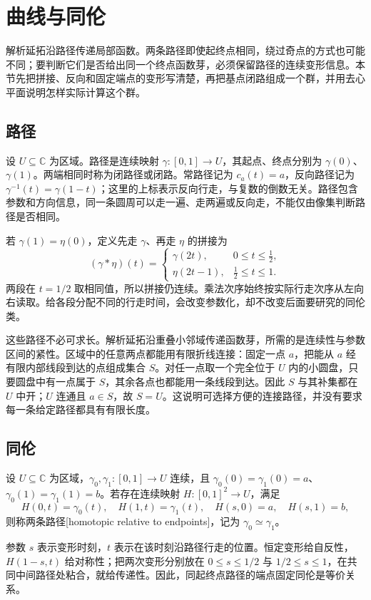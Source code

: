 \section{曲线与同伦}
\label{b3:sec:0901}

解析延拓沿路径传递局部函数。两条路径即使起终点相同，绕过奇点的方式也可能不同；要判断它们是否给出同一个终点函数芽，必须保留路径的连续变形信息。本节先把拼接、反向和固定端点的变形写清楚，再把基点闭路组成一个群，并用去心平面说明怎样实际计算这个群。

\subsection{路径}
\label{b3:subsec:090101}

设 \(U\subseteq\mathbb C\) 为区域。路径是连续映射 \(\gamma:[0,1]\to U\)，其起点、终点分别为 \(\gamma(0)\)、\(\gamma(1)\)。两端相同时称为闭路径或闭路。常路径记为 \(c_a(t)=a\)，反向路径记为 \(\gamma^{-1}(t)=\gamma(1-t)\)；这里的上标表示反向行走，与复数的倒数无关。路径包含参数和方向信息，同一条圆周可以走一遍、走两遍或反向走，不能仅由像集判断路径是否相同。

\ProseParagraphBreak
若 \(\gamma(1)=\eta(0)\)，定义先走 \(\gamma\)、再走 \(\eta\) 的拼接为
\[
 (\gamma*\eta)(t)=
 \begin{cases}
  \gamma(2t),&0\le t\le\tfrac12,\\
  \eta(2t-1),&\tfrac12\le t\le1.
 \end{cases}
\]
两段在 \(t=1/2\) 取相同值，所以拼接仍连续。乘法次序始终按实际行走次序从左向右读取。给各段分配不同的行走时间，会改变参数化，却不改变后面要研究的同伦类。

\ProseParagraphBreak
这些路径不必可求长。解析延拓沿重叠小邻域传递函数芽，所需的是连续性与参数区间的紧性。区域中的任意两点都能用有限折线连接：固定一点 \(a\)，把能从 \(a\) 经有限内部线段到达的点组成集合 \(S\)。对任一点取一个完全位于 \(U\) 内的小圆盘，只要圆盘中有一点属于 \(S\)，其余各点也都能用一条线段到达。因此 \(S\) 与其补集都在 \(U\) 中开；\(U\) 连通且 \(a\in S\)，故 \(S=U\)。这说明可选择方便的连接路径，并没有要求每一条给定路径都具有有限长度。

\subsection{同伦}
\label{b3:subsec:090102}

\begin{definition}\label{b3:def:09-endpoint-homotopy}
设 \(U\subseteq\mathbb C\) 为区域，\(\gamma_0,\gamma_1:[0,1]\to U\) 连续，且 \(\gamma_0(0)=\gamma_1(0)=a\)、\(\gamma_0(1)=\gamma_1(1)=b\)。若存在连续映射 \(H:[0,1]^2\to U\)，满足
\[
 H(0,t)=\gamma_0(t),\quad H(1,t)=\gamma_1(t),
 \quad H(s,0)=a,\quad H(s,1)=b,
\]
则称两条路径[homotopic relative to endpoints]，记为 \(\gamma_0\simeq\gamma_1\)。
\end{definition}
参数 \(s\) 表示变形时刻，\(t\) 表示在该时刻沿路径行走的位置。恒定变形给自反性，\(H(1-s,t)\) 给对称性；把两次变形分别放在 \(0\le s\le1/2\) 与 \(1/2\le s\le1\)，在共同中间路径处粘合，就给传递性。因此，同起终点路径的端点固定同伦是等价关系。

